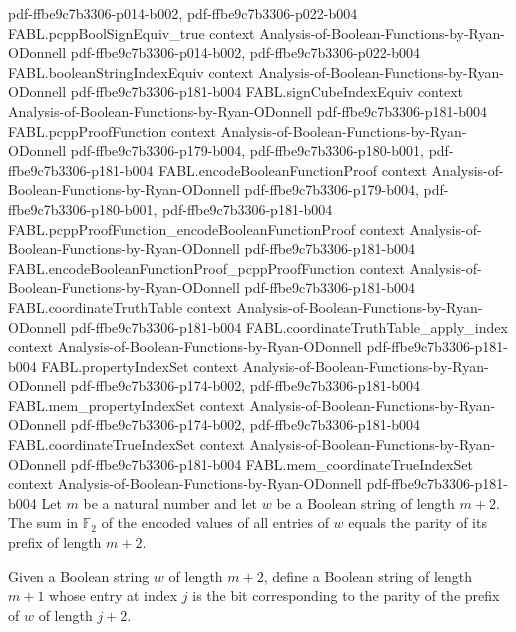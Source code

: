 \begin{theorem}
  {pdf-ffbe9c7b3306-p014-b002,
    pdf-ffbe9c7b3306-p022-b004}
\proofstep
  {FABL.pcppBoolSignEquiv_true}
  {context}
  {Analysis-of-Boolean-Functions-by-Ryan-ODonnell}
  {pdf-ffbe9c7b3306-p014-b002,
    pdf-ffbe9c7b3306-p022-b004}
\proofstep
  {FABL.booleanStringIndexEquiv}
  {context}
  {Analysis-of-Boolean-Functions-by-Ryan-ODonnell}
  {pdf-ffbe9c7b3306-p181-b004}
\proofstep
  {FABL.signCubeIndexEquiv}
  {context}
  {Analysis-of-Boolean-Functions-by-Ryan-ODonnell}
  {pdf-ffbe9c7b3306-p181-b004}
\proofstep
  {FABL.pcppProofFunction}
  {context}
  {Analysis-of-Boolean-Functions-by-Ryan-ODonnell}
  {pdf-ffbe9c7b3306-p179-b004,
    pdf-ffbe9c7b3306-p180-b001,
    pdf-ffbe9c7b3306-p181-b004}
\proofstep
  {FABL.encodeBooleanFunctionProof}
  {context}
  {Analysis-of-Boolean-Functions-by-Ryan-ODonnell}
  {pdf-ffbe9c7b3306-p179-b004,
    pdf-ffbe9c7b3306-p180-b001,
    pdf-ffbe9c7b3306-p181-b004}
\proofstep
  {FABL.pcppProofFunction_encodeBooleanFunctionProof}
  {context}
  {Analysis-of-Boolean-Functions-by-Ryan-ODonnell}
  {pdf-ffbe9c7b3306-p181-b004}
\proofstep
  {FABL.encodeBooleanFunctionProof_pcppProofFunction}
  {context}
  {Analysis-of-Boolean-Functions-by-Ryan-ODonnell}
  {pdf-ffbe9c7b3306-p181-b004}
\proofstep
  {FABL.coordinateTruthTable}
  {context}
  {Analysis-of-Boolean-Functions-by-Ryan-ODonnell}
  {pdf-ffbe9c7b3306-p181-b004}
\proofstep
  {FABL.coordinateTruthTable_apply_index}
  {context}
  {Analysis-of-Boolean-Functions-by-Ryan-ODonnell}
  {pdf-ffbe9c7b3306-p181-b004}
\proofstep
  {FABL.propertyIndexSet}
  {context}
  {Analysis-of-Boolean-Functions-by-Ryan-ODonnell}
  {pdf-ffbe9c7b3306-p174-b002,
    pdf-ffbe9c7b3306-p181-b004}
\proofstep
  {FABL.mem_propertyIndexSet}
  {context}
  {Analysis-of-Boolean-Functions-by-Ryan-ODonnell}
  {pdf-ffbe9c7b3306-p174-b002,
    pdf-ffbe9c7b3306-p181-b004}
\proofstep
  {FABL.coordinateTrueIndexSet}
  {context}
  {Analysis-of-Boolean-Functions-by-Ryan-ODonnell}
  {pdf-ffbe9c7b3306-p181-b004}
\proofstep
  {FABL.mem_coordinateTrueIndexSet}
  {context}
  {Analysis-of-Boolean-Functions-by-Ryan-ODonnell}
  {pdf-ffbe9c7b3306-p181-b004}
Let $m$ be a natural number and let $w$ be a Boolean string of length $m+2$. The sum in
$\mathbb{F}_2$ of the encoded values of all entries of $w$ equals the parity of its
prefix of length $m+2$.
\end{theorem}

\begin{definition}
\label{FABL.oddWeightPartialSumProof}
\leanok
{}
Given a Boolean string $w$ of length $m+2$, define a Boolean string of length $m+1$
whose entry at index $j$ is the bit corresponding to the parity of the prefix of $w$ of
length $j+2$.
\end{definition}

